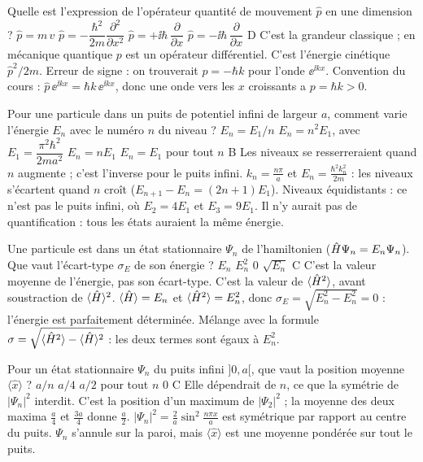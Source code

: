   {Quelle est l'expression de l'opérateur quantité de mouvement $\hat p$ en une dimension ?}
  {$\hat p=m\,v$}
  {$\hat p=-\dfrac{\hbar^2}{2m}\dfrac{\partial^2}{\partial x^2}$}
  {$\hat p=+\ii\hbar\,\dfrac{\partial}{\partial x}$}
  {$\hat p=-\ii\hbar\,\dfrac{\partial}{\partial x}$}
  {D}
\qcmx
  {C'est la grandeur classique ; en mécanique quantique $p$ est un opérateur différentiel.}
  {C'est l'énergie cinétique $\hat p^2/2m$.}
  {Erreur de signe : on trouverait $p=-\hbar k$ pour l'onde $\ee^{\ii kx}$.}
  {Convention du cours : $\hat p\,\ee^{\ii kx}=\hbar k\,\ee^{\ii kx}$, donc une onde vers les $x$ croissants a $p=\hbar k>0$.}

  {Pour une particule dans un puits de potentiel infini de largeur $a$, comment varie l'énergie $E_n$ avec le numéro $n$ du niveau ?}
  {$E_n=E_1/n$}
  {$E_n=n^2E_1$, avec $E_1=\dfrac{\pi^2\hbar^2}{2ma^2}$}
  {$E_n=nE_1$}
  {$E_n=E_1$ pour tout $n$}
  {B}
\qcmx
  {Les niveaux se resserreraient quand $n$ augmente ; c'est l'inverse pour le puits infini.}
  {$k_n=\frac{n\pi}{a}$ et $E_n=\frac{\hbar^2k_n^2}{2m}$ : les niveaux s'écartent quand $n$ croît ($E_{n+1}-E_n=(2n+1)E_1$).}
  {Niveaux équidistants : ce n'est pas le puits infini, où $E_2=4E_1$ et $E_3=9E_1$.}
  {Il n'y aurait pas de quantification : tous les états auraient la même énergie.}

  {Une particule est dans un état stationnaire $\Psi_n$ de l'hamiltonien ($\hat{H}\Psi_n=E_n\Psi_n$). Que vaut l'écart-type $\sigma_E$ de son énergie ?}
  {$E_n$}
  {$E_n^2$}
  {$0$}
  {$\sqrt{E_n}$}
  {C}
\qcmx
  {C'est la valeur moyenne de l'énergie, pas son écart-type.}
  {C'est la valeur de $\langle\hat{H}^2\rangle$, avant soustraction de $\langle\hat{H}\rangle^2$.}
  {$\langle\hat{H}\rangle=E_n$ et $\langle\hat{H}^2\rangle=E_n^2$, donc $\sigma_E=\sqrt{E_n^2-E_n^2}=0$ : l'énergie est parfaitement déterminée.}
  {Mélange avec la formule $\sigma=\sqrt{\langle\hat{H}^2\rangle-\langle\hat{H}\rangle^2}$ : les deux termes sont égaux à $E_n^2$.}

  {Pour un état stationnaire $\Psi_n$ du puits infini $]0,a[$, que vaut la position moyenne $\langle\hat x\rangle$ ?}
  {$a/n$}
  {$a/4$}
  {$a/2$ pour tout $n$}
  {$0$}
  {C}
\qcmx
  {Elle dépendrait de $n$, ce que la symétrie de $|\Psi_n|^2$ interdit.}
  {C'est la position d'un maximum de $|\Psi_2|^2$ ; la moyenne des deux maxima $\frac a4$ et $\frac{3a}{4}$ donne $\frac a2$.}
  {$|\Psi_n|^2=\frac2a\sin^2\frac{n\pi x}{a}$ est symétrique par rapport au centre du puits.}
  {$\Psi_n$ s'annule sur la paroi, mais $\langle\hat x\rangle$ est une moyenne pondérée sur tout le puits.}

